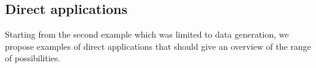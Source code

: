 


\subsection*{Direct applications}


Starting from the second example which was limited to data generation, we propose examples of direct applications that should give an overview of the range of possibilities.


